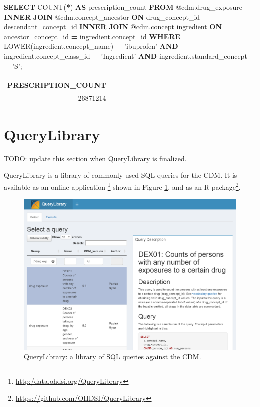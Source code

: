 \documentclass[11pt]{book}
\newenvironment{Shaded}{\begin{snugshade}}{\end{snugshade}}
\newcommand{\FunctionTok}[1]{\textcolor[rgb]{0.00,0.00,0.00}{#1}}
\newcommand{\KeywordTok}[1]{\textcolor[rgb]{0.13,0.29,0.53}{\textbf{#1}}}
\newcommand{\NormalTok}[1]{#1}
\newcommand{\OperatorTok}[1]{\textcolor[rgb]{0.81,0.36,0.00}{\textbf{#1}}}
\newcommand{\StringTok}[1]{\textcolor[rgb]{0.31,0.60,0.02}{#1}}
\let\rmarkdownfootnote\footnote%
\def\footnote{\protect\rmarkdownfootnote}
\theoremstyle{definition}
\theoremstyle{definition}
\theoremstyle{definition}
\theoremstyle{remark}
\begin{document}
\begin{Shaded}
\begin{Highlighting}[]
\KeywordTok{SELECT} \FunctionTok{COUNT}\NormalTok{(}\OperatorTok{*}\NormalTok{) }\KeywordTok{AS}\NormalTok{ prescription_count}
\KeywordTok{FROM}\NormalTok{ @cdm.drug_exposure}
\KeywordTok{INNER} \KeywordTok{JOIN}\NormalTok{ @cdm.concept_ancestor}
  \KeywordTok{ON}\NormalTok{ drug_concept_id }\OperatorTok{=}\NormalTok{ descendant_concept_id}
\KeywordTok{INNER} \KeywordTok{JOIN}\NormalTok{ @cdm.concept ingredient}
  \KeywordTok{ON}\NormalTok{ ancestor_concept_id }\OperatorTok{=}\NormalTok{ ingredient.concept_id}
\KeywordTok{WHERE} \FunctionTok{LOWER}\NormalTok{(ingredient.concept_name) }\OperatorTok{=} \StringTok{'ibuprofen'}
  \KeywordTok{AND}\NormalTok{ ingredient.concept_class_id }\OperatorTok{=} \StringTok{'Ingredient'}
  \KeywordTok{AND}\NormalTok{ ingredient.standard_concept }\OperatorTok{=} \StringTok{'S'}\NormalTok{;}
\end{Highlighting}
\end{Shaded}

\begin{longtable}[]{@{}r@{}}
\toprule
PRESCRIPTION\_COUNT\tabularnewline
\midrule
\endhead
26871214\tabularnewline
\bottomrule
\end{longtable}

\hypertarget{querylibrary}{%
\section{QueryLibrary}\label{querylibrary}}

TODO: update this section when QueryLibrary is finalized.

QueryLibrary is a library of commonly-used SQL queries for the CDM. It is available as an online application \footnote{\url{http:/data.ohdsi.org/QueryLibrary}} shown in Figure \ref{fig:queryLibrary}, and as an R package\footnote{\url{https://github.com/OHDSI/QueryLibrary}}.

\begin{figure}

{\centering \includegraphics[width=1\linewidth]{images/SqlAndR/queryLibrary} 

}

\caption{QueryLibrary: a library of SQL queries against the CDM.}\label{fig:queryLibrary}
\end{figure}
\end{document}
